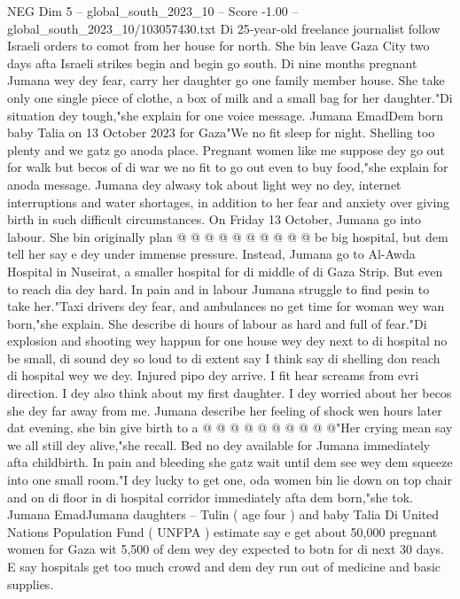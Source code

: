 \begin{textsample}{NEG Dim 5 – global\_south\_2023\_10 – Score -1.00 – global\_south\_2023\_10/103057430.txt}  \label{ex:f5_neg_099}
Di 25-year-old freelance journalist follow Israeli orders to comot from her house for north.
She bin leave Gaza City two days afta Israeli strikes begin and begin go south.
Di nine months pregnant Jumana wey dey fear, carry her daughter go one family member house.
She take only one single piece of clothe, a box of milk and a small bag for her daughter."Di situation dey tough,"she explain for one voice message.
Jumana EmadDem born baby Talia on 13 October 2023 for Gaza"We no fit sleep for night.
Shelling too plenty and we gatz go anoda place.
Pregnant women like me suppose dey go out for walk but becos of di war we no fit to go out even to buy food,"she explain for anoda message.
Jumana dey alwasy tok about light wey no dey, internet interruptions and water shortages, in addition to her fear and anxiety over giving birth in such difficult circumstances.
On Friday 13 October, Jumana go into labour.
She bin originally plan @ @ @ @ @ @ @ @ @ @ be big hospital, but dem tell her say e dey under immense pressure.
Instead, Jumana go to Al-Awda Hospital in Nuseirat, a smaller hospital for di middle of di Gaza Strip.
But even to reach dia dey hard.
In pain and in labour Jumana struggle to find pesin to take her."Taxi drivers dey fear, and ambulances no get time for woman wey wan born,"she explain.
She describe di hours of labour as hard and full of fear."Di explosion and shooting wey happun for one house wey dey next to di hospital no be small, di sound dey so loud to di extent say I think say di shelling don reach di hospital wey we dey.
Injured pipo dey arrive.
I fit hear screams from evri direction.
I dey also think about my first daughter.
I dey worried about her becos she dey far away from me.
Jumana describe her feeling of shock wen hours later dat evening, she bin give birth to a @ @ @ @ @ @ @ @ @ @"Her crying mean say we all still dey alive,"she recall.
Bed no dey available for Jumana immediately afta childbirth.
In pain and bleeding she gatz wait until dem see wey dem squeeze into one small room."I dey lucky to get one, oda women bin lie down on top chair and on di floor in di hospital corridor immediately afta dem born,"she tok.
Jumana EmadJumana daughters -- Tulin ( age four ) and baby Talia Di United Nations Population Fund ( UNFPA ) estimate say e get about 50,000 pregnant women for Gaza wit 5,500 of dem wey dey expected to botn for di next 30 days.
E say hospitals get too much crowd and dem dey run out of medicine and basic supplies.

\end{textsample}
